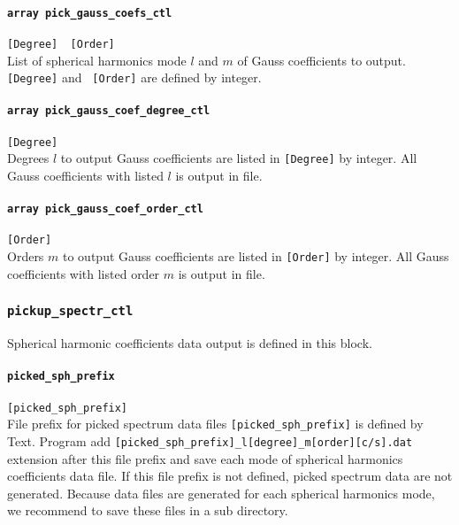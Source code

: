 \paragraph{\tt array pick\_gauss\_coefs\_ctl}
\label{href_t:pick_gauss_coefs_ctl}
\verb|[Degree]  [Order]| \\
List of spherical harmonics mode $l$ and $m$ of Gauss coefficients to output. \verb|[Degree]| and \verb| [Order]| are defined by integer.

\paragraph{\tt array pick\_gauss\_coef\_degree\_ctl}
\label{href_t:pick_gauss_coef_degree_ctl}
\verb|[Degree]| \\
Degrees $l$ to output Gauss coefficients are listed in \verb|[Degree]| by integer. All Gauss coefficients with listed $l$ is output in file.

\paragraph{\tt array pick\_gauss\_coef\_order\_ctl}
\label{href_t:pick_gauss_coef_order_ctl}
\verb|[Order]| \\
Orders $m$ to output Gauss coefficients are listed in \verb|[Order]| by integer. All Gauss coefficients with listed order $m$ is output in file.

%
\subsubsection{\tt pickup\_spectr\_ctl}
\label{href_t:pickup_spectr_ctl}
Spherical harmonic coefficients data output is defined in this block.

\paragraph{\tt picked\_sph\_prefix}
\label{href_t:picked_sph_prefix}
\verb|[picked_sph_prefix]| \\
File prefix for picked spectrum data files \verb|[picked_sph_prefix]| is defined by Text. Program add {\tt [picked\_sph\_prefix]\_l[degree]\_m[order][c/s].dat} extension after this file prefix and save each mode of spherical harmonics coefficients data file. If this file prefix is not defined, picked spectrum data are not generated. Because data files are generated for each spherical harmonics mode, we recommend to save these files in a sub directory.


